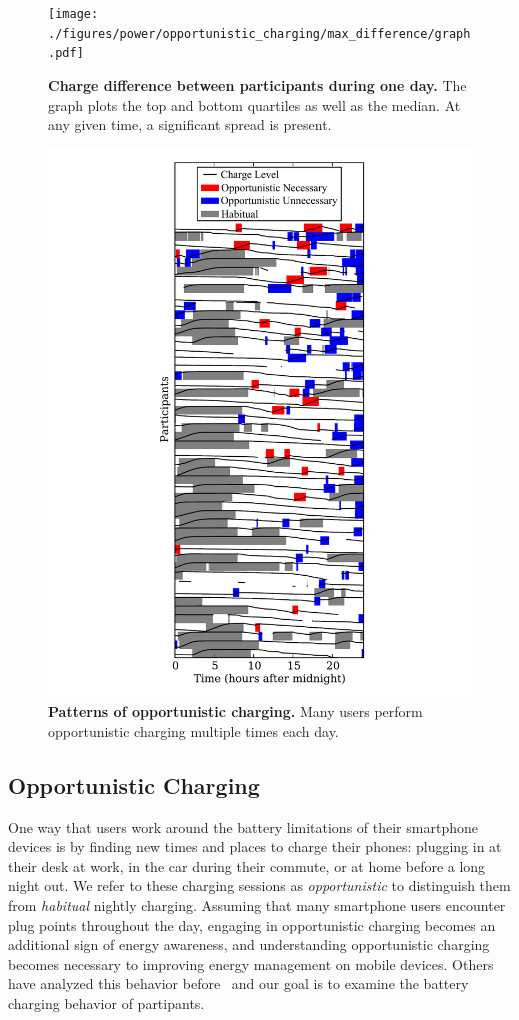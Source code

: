 \begin{figure}[th!]

\centering
\texttt{[image: ./figures/power/opportunistic\_charging/max\_difference/graph.pdf]}

\caption{\textbf{Charge difference between participants during one day.} The
graph plots the top and bottom quartiles as well as the median. At any given
time, a significant spread is present.}

\label{fig-opportunistic-spread}

\vspace*{0.2in}

\centering
\includegraphics[width=0.7\columnwidth]{./figures/power/opportunistic_charging/count_and_by_time/graph.pdf}

\caption{\textbf{Patterns of opportunistic charging.} Many users perform
opportunistic charging multiple times each day.}

\label{fig-opportunistic-patterns}

\end{figure}


\subsection{Opportunistic Charging}
\label{subsec-opportunistic}

One way that users work around the battery limitations of their smartphone
devices is by finding new times and places to charge their phones: plugging
in at their desk at work, in the car during their commute, or at home before
a long night out. We refer to these charging sessions as
\textit{opportunistic} to distinguish them from \textit{habitual} nightly
charging. Assuming that many smartphone users encounter plug points
throughout the day, engaging in opportunistic charging becomes an additional
sign of energy awareness, and understanding opportunistic charging becomes
necessary to improving energy management on mobile devices. Others have analyzed
this behavior before~\cite{banerjee:ubicomp:2007, rahmati:mobilehci:2007} and
our goal is to examine the battery charging behavior of \PhoneLab{} partipants.

